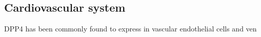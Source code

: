 \subsection{Cardiovascular system}
DPP4 has been commonly found to express in vascular endothelial cells and ven~